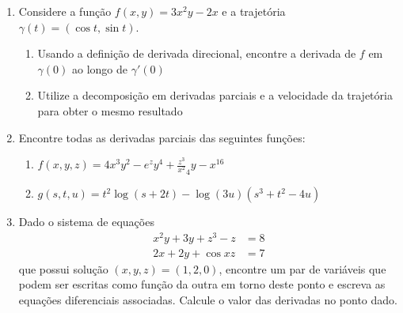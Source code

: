 \begin{enumerate}
    \item
        Considere a função $f(x,y) = 3x^2y-2x$ e a trajetória $\gamma(t)=
        (\cos t,\sin t)$.
        \begin{enumerate}
            \item
                Usando a definição de derivada direcional, encontre a derivada
                de $f$ em $\gamma(0)$ ao longo de $\gamma'(0)$
            \item
                Utilize a decomposição em derivadas parciais e a velocidade da
                trajetória para obter o mesmo resultado
        \end{enumerate}

        \item Encontre todas as derivadas parciais das seguintes funções:
        \begin{enumerate}
            \item 
                $f(x,y,z)=4x^3y^2-e^zy^4+\frac{z^3}{x^2}_4y-x^{16}$
            \item 
                $g(s,t,u)=t^2\log(s+2t)-\log(3u)(s^3+t^2-4u)$
        \end{enumerate}

    \item
        Dado o sistema de equações
        \begin{align*}
            x^2y+3y+z^3-z&=8\\
            2x+2y+\cos xz&=7
        \end{align*}
        que possui solução $(x,y,z)=(1,2,0)$, encontre um par de variáveis que
        podem ser escritas como função da outra em torno deste ponto e escreva
        as equações diferenciais associadas. Calcule o valor das derivadas no
        ponto dado.


\end{enumerate}
